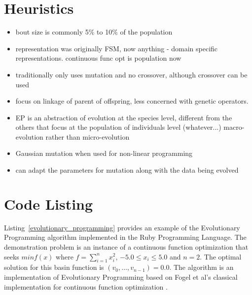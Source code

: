 \documentclass[a4paper, 11pt]{article}
\begin{document}
\section{Heuristics}
\label{sec:heuristics}
\begin{itemize}
	\item bout size is commonly 5\% to 10\% of the population
	\item representation was originally FSM, now anything - domain specific representations. continuous func opt is population now
	\item traditionally only uses mutation and no crossover, although crossover can be used
	\item focus on linkage of parent of offspring, less concerned with genetic operators.
	\item EP is an abstraction of evolution at the species level, different from the others that focus at the population of individuals level (whatever...) macro-evolution rather than micro-evolution
	\item Gaussian mutation when used for non-linear programming
	\item can adapt the parameters for mutation along with the data being evolved \cite{Fogel1991a}
	
\end{itemize}

\section{Code Listing}
\label{sec:code}
Listing~\ref{evolutionary_programming} provides an example of the Evolutionary Programming algorithm implemented in the Ruby Programming Language.
The demonstration problem is an instance of a continuous function optimization that seeks $min f(x)$ where $f=\sum_{i=1}^n x_{i}^2$, $-5.0\leq x_i \leq 5.0$ and $n=2$. The optimal solution for this basin function is $(v_0,\ldots,v_{n-1})=0.0$.
The algorithm is an implementation of Evolutionary Programming based on Fogel et al's classical implementation for continuous function optimization \cite{Fogel1991a}.
\end{document}
